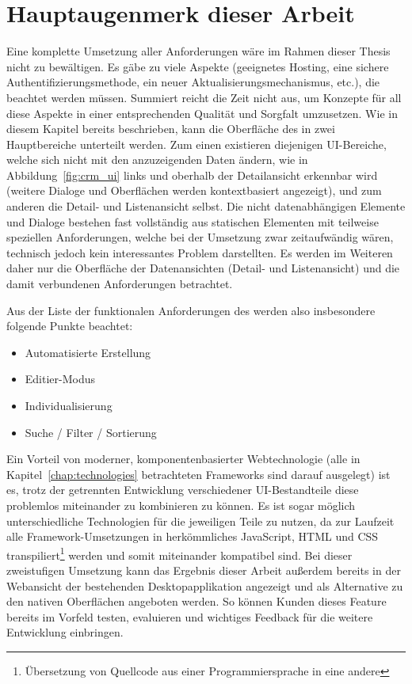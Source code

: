 \section{Hauptaugenmerk dieser Arbeit}
Eine komplette Umsetzung aller Anforderungen wäre im Rahmen dieser Thesis nicht zu bewältigen. Es gäbe zu viele Aspekte (geeignetes Hosting, eine sichere Authentifizierungsmethode, ein neuer Aktualisierungsmechanismus, etc.), die beachtet werden müssen. Summiert reicht die Zeit nicht aus, um Konzepte für all diese Aspekte in einer entsprechenden Qualität und Sorgfalt umzusetzen. 
Wie in diesem Kapitel bereits beschrieben, kann die Oberfläche des  in zwei Hauptbereiche unterteilt werden. Zum einen existieren diejenigen UI-Bereiche, welche sich nicht mit den anzuzeigenden Daten ändern, wie in Abbildung~\ref{fig:crm_ui} links und oberhalb der Detailansicht erkennbar wird (weitere Dialoge und Oberflächen werden kontextbasiert angezeigt), und zum anderen die Detail- und Listenansicht selbst. Die nicht datenabhängigen Elemente und Dialoge bestehen fast vollständig aus statischen Elementen mit teilweise speziellen Anforderungen, welche bei der Umsetzung zwar zeitaufwändig wären, technisch jedoch kein interessantes Problem darstellten. Es werden im Weiteren daher nur die Oberfläche der Datenansichten (Detail- und Listenansicht) und die damit verbundenen Anforderungen betrachtet. 

Aus der Liste der funktionalen Anforderungen des  werden also insbesondere folgende Punkte beachtet:
\begin{itemize}
    \item{Automatisierte Erstellung}
    \item{Editier-Modus}
    \item{Individualisierung}
    \item{Suche / Filter / Sortierung}
\end{itemize}

Ein Vorteil von moderner, komponentenbasierter Webtechnologie (alle in Kapitel~\ref{chap:technologies} betrachteten Frameworks sind darauf ausgelegt) ist es, trotz der getrennten Entwicklung verschiedener UI-Bestandteile diese problemlos miteinander zu kombinieren zu können. Es ist sogar möglich unterschiedliche Technologien für die jeweiligen Teile zu nutzen, da zur Laufzeit alle Framework-Umsetzungen in herkömmliches JavaScript, HTML und CSS transpiliert\footnote{Übersetzung von Quellcode aus einer Programmiersprache in eine andere} werden und somit miteinander kompatibel sind.
Bei dieser zweistufigen Umsetzung kann das Ergebnis dieser Arbeit außerdem bereits in der Webansicht der bestehenden Desktopapplikation angezeigt und als Alternative zu den nativen Oberflächen angeboten werden. So können Kunden dieses Feature bereits im Vorfeld testen, evaluieren und wichtiges Feedback für die weitere Entwicklung einbringen.
